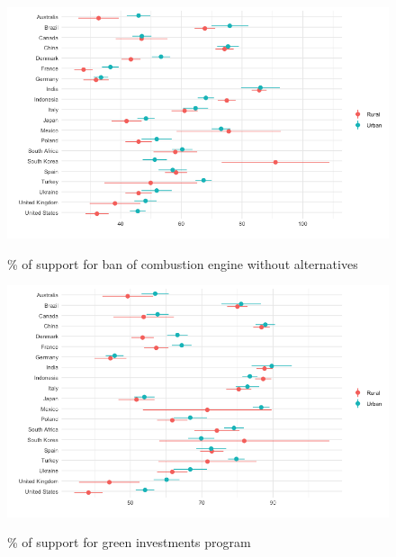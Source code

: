 \begin{frame}{}%
\begin{figure}[h!]
\caption{\% of support for ban of combustion engine without alternatives} %
\includegraphics[width=.7\paperwidth]{../figures/country_comparison/standard_support_urban_each_country.png} \\
\end{figure}
\end{frame}

\begin{frame}{}%
\begin{figure}[h!]
\caption{\% of support for green investments program} %
\includegraphics[width=.7\paperwidth]{../figures/country_comparison/investments_support_urban_each_country.png} \\
\end{figure}
\end{frame}

